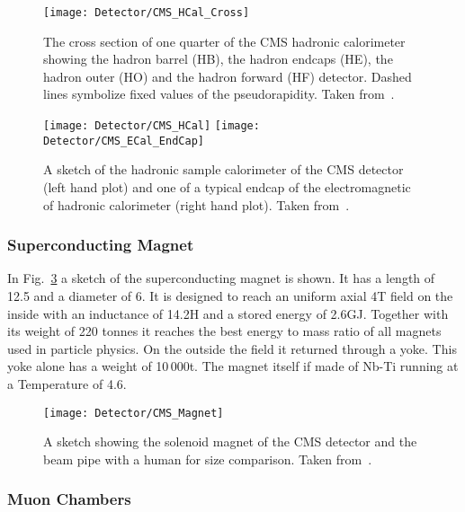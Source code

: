 \begin{figure}[Htb]
    \centering
    \texttt{[image: Detector/CMS\_HCal\_Cross]}
    \caption[Cross section of the CMS hadronic calorimeter]{The cross section of one quarter of the CMS hadronic calorimeter showing the hadron barrel (HB), the hadron endcaps (HE), the hadron outer (HO) and the hadron forward (HF) detector. Dashed lines symbolize fixed values of the pseudorapidity. Taken from~. \label{plot:LHCCMSHCalCross}}
\end{figure}

\begin{figure}[Htb]
  \centering
  \texttt{[image: Detector/CMS\_HCal]}
  \texttt{[image: Detector/CMS\_ECal\_EndCap]}
  \caption[Sketches of the hadronic calorimeter of CMS]{A sketch of the hadronic sample calorimeter of the CMS detector (left hand plot) and one of a typical endcap of the electromagnetic of hadronic calorimeter (right hand plot). Taken from~. \label{plot:LHCCMSHCalCMS}}
\end{figure}

\subsubsection{Superconducting Magnet}

In Fig.~\ref{plot:LHCCMSMagnetCMS} a sketch of the superconducting magnet is shown. It has a length of 12.5\m{} and a diameter of 6\m{}. It is designed to reach an uniform axial 4\unit{T} field on the inside with an inductance of 14.2\unit{H} and a stored energy of 2.6\unit{GJ}. Together with its weight of 220 tonnes it reaches the best energy to mass ratio of all magnets used in particle physics. On the outside the field it returned through a yoke. This yoke alone has a weight of 10\,000\unit{t}. The magnet itself if made of Nb-Ti running at a Temperature of 4.6\K{}.

\begin{figure}[Htb]
  \centering
  \texttt{[image: Detector/CMS\_Magnet]}
  \caption[Sketch of the solenoid magnet]{A sketch showing the solenoid magnet of the CMS detector and the beam pipe with a human for size comparison. Taken from~. \label{plot:LHCCMSMagnetCMS}}
\end{figure}

\subsubsection{Muon Chambers}


